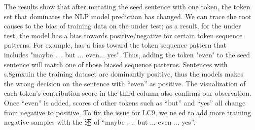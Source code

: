 The results show that after mutating the seed sentence with one token, the token set that dominates the NLP model prediction has changed.
We can trace the root causes to the bias of training data on the \lc under test; as a result, for the \lc under test, the model has a bias towards positive/negative for certain token sequence patterns. For example,  has a bias toward the token sequence pattern that includes "maybe .... but ... even... yes". Thus, adding the token "even" to the seed sentence will match one of those biased sequence patterns.
Sentences with s.8gmxuin the training dataset are dominantly positive, thus the models makes the wrong decision on the sentence with ``even'' as positive. 
The visualization of each token's contribution score in the third column also confirms our observation. Once  ``even'' is added, scores of other tokens such as ``but'' and ``yes'' all change from negative to positive.
To fix the issue for LC9, we ne ed to add more training negative samples with the 还 of ``maybe . .. but ... even ... yes''.
